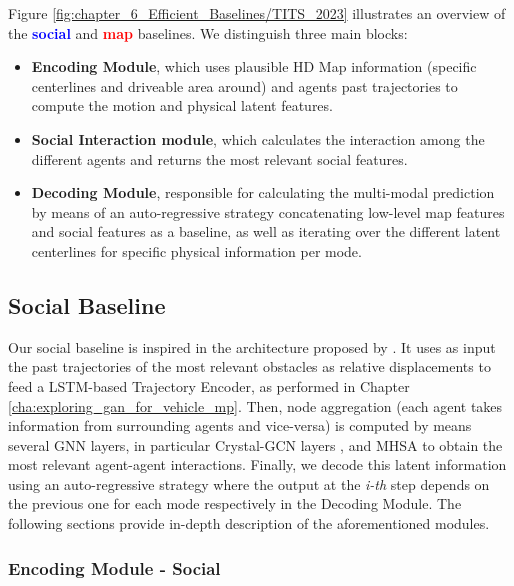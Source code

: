 Figure \ref{fig:chapter_6_Efficient_Baselines/TITS_2023} illustrates an overview of the \textbf{\textcolor{blue}{social}} and \textbf{\textcolor{red}{map}} baselines. We distinguish three main blocks: 

\begin{itemize}
	
	\item \textbf{Encoding Module}, which uses plausible HD Map information (specific centerlines and driveable area around) and agents past trajectories to compute the motion and physical latent features.
	
	\item \textbf{Social Interaction module}, which calculates the interaction among the different agents and returns the most relevant social features.
	
	\item \textbf{Decoding Module}, responsible for calculating the multi-modal prediction by means of an auto-regressive strategy concatenating low-level map features and social features as a baseline, as well as iterating over the different latent centerlines for specific physical information per mode.
\end{itemize}

\subsection{Social Baseline}
\label{subsec:6_efficient_baselines_social}

Our social baseline is inspired in the architecture proposed by \cite{schmidt2022crat}. It uses as input the past trajectories of the most relevant obstacles as relative displacements to feed a \ac{LSTM}-based Trajectory Encoder, as performed in Chapter \ref{cha:exploring_gan_for_vehicle_mp}. Then, node aggregation (each agent takes information from surrounding agents and vice-versa) is computed by means several \ac{GNN} layers, in particular Crystal-\acf{GCN} layers \cite{xie2018crystal, schmidt2022crat}, and \ac{MHSA} \cite{vaswani2017attention} to obtain the most relevant agent-agent interactions. Finally, we decode this latent information using an auto-regressive strategy where the output at the \textit{i-th} step depends on the previous one for each mode respectively in the Decoding Module. The following sections provide in-depth description of the aforementioned modules.

\subsubsection{Encoding Module - Social}
\label{subsubsec:6_efficient_baselines_social_encoding}

